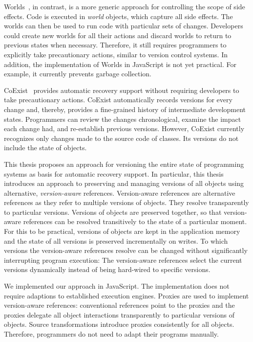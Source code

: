 Worlds~\cite{Warth2011Wor,Warth2009PhD}, in contrast, is a more generic approach for controlling the scope of side effects.
Code is executed in \emph{world} objects, which capture all side effects.
The worlds can then be used to run code with particular sets of changes.
Developers could create new worlds for all their actions and discard worlds to return to previous states when necessary.
Therefore, it still requires programmers to explicitly take precautionary actions, similar to version control systems.
In addition, the implementation of Worlds in JavaScript is not yet practical.
For example, it currently prevents garbage collection.

CoExist~\cite{Steinert2012COE,Steinert2014EVA} provides automatic recovery support without requiring developers to take precautionary actions.
CoExist automatically records versions for every change and, thereby, provides a fine-grained history of intermediate development states.
Programmers can review the changes chronological, examine the impact each change had, and re-establish previous versions.
However, CoExist currently recognizes only changes made to the source code of classes.
Its versions do not include the state of objects.

This thesis proposes an approach for versioning the entire state of programming systems as basis for automatic recovery support.
In particular, this thesis introduces an approach to preserving and managing versions of all objects using alternative, \emph{version-aware} references.
Version-aware references are alternative references as they refer to multiple versions of objects.
They resolve transparently to particular versions.
Versions of objects are preserved together, so that version-aware references can be resolved transitively to the state of a particular moment.
For this to be practical, versions of objects are kept in the application memory and the state of all versions is preserved incrementally on writes.
To which versions the version-aware references resolve can be changed without significantly interrupting program execution:
The version-aware references select the current versions dynamically instead of being hard-wired to specific versions.

We implemented our approach in JavaScript.
The implementation does not require adaptions to established execution engines.
Proxies are used to implement version-aware references: conventional references point to the proxies and the proxies delegate all object interactions transparently to particular versions of objects.
Source transformations introduce proxies consistently for all objects.
Therefore, programmers do not need to adapt their programs manually.

